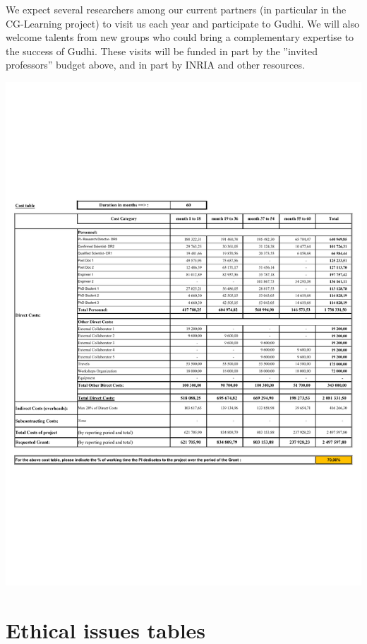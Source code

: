 We expect several researchers among our current partners (in particular in the CG-Learning project) to visit us each year and participate to Gudhi. We will also welcome talents from new groups who could bring a complementary expertise to the success of Gudhi. These visits will be funded in part by the ”invited professors” budget above, and in part by INRIA and other resources.
\vspace{4mm}

\includegraphics[width=\textwidth]{budget2}



\section{Ethical issues tables}

